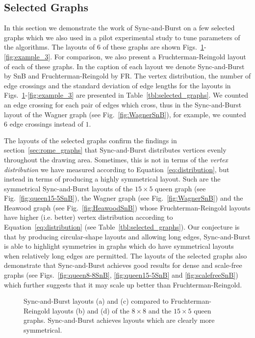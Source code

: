 \documentclass{llncs}
\begin{document}
\subsection{Selected Graphs}\label{sec:selected_graphs}

In this section we demonstrate the work of Sync-and-Burst on a few selected graphs which we also used in a pilot experimental study to tune parameters of the algorithms. The layouts of $6$ of these graphs are shown Figs.~\ref{fig:example_1}-\ref{fig:example_3}. For comparison, we also present a Fruchterman-Reingold layout of each of these graphs. In the caption of each layout we denote Sync-and-Burst by SnB and Fruchterman-Reingold by FR. The vertex distribution, the number of edge crossings and the standard deviation of edge lengths for the layouts in Figs.~\ref{fig:example_1}-\ref{fig:example_3} are presented in Table~\ref{tbl:selected_graphs}. We counted an edge crossing for each pair of edges which cross, thus in the Sync-and-Burst layout of the Wagner graph (see Fig.~\ref{fig:WagnerSnB}), for example, we counted $6$ edge crossings instead of $1$.

The layouts of the selected graphs confirm the findings in section~\ref{sec:rome_graphs} that Sync-and-Burst distributes vertices evenly throughout the drawing area. Sometimes, this is not in terms of the \emph{vertex distribution} we have measured according to Equation~\eqref{eq:distribution}, but instead in terms of producing a highly symmetrical layout. Such are the symmetrical Sync-and-Burst layouts of the $15 \times 5$ queen graph (see Fig.~\ref{fig:queen15-5SnB}), the Wagner graph (see Fig.~\ref{fig:WagnerSnB}) and the Heawood graph (see Fig.~\ref{fig:HeawoodSnB}) whose Fruchterman-Reingold layouts have higher (i.e. better) vertex distribution according to Equation~\eqref{eq:distribution} (see Table~\ref{tbl:selected_graphs}). Our conjecture is that by producing circular-shape layouts and allowing long edges, Sync-and-Burst is able to highlight symmetries in graphs which do have symmetrical layouts when relatively long edges are permitted. The layouts of the selected graphs also demonstrate that Sync-and-Burst achieves good results for dense and scale-free graphs (see Figs.~\ref{fig:queen8-8SnB}, \ref{fig:queen15-5SnB} and \ref{fig:scalefreeSnB}) which further suggests that it may scale up better than Fruchterman-Reingold. 

\begin{figure}
\centering
{}
\caption{Sync-and-Burst layouts (a) and (c) compared to Fruchterman-Reingold layouts (b) and (d) of the $8 \times 8$ and the $15 \times 5$ queen graphs. Sync-and-Burst achieves layouts which are clearly more symmetrical.}
\label{fig:example_1}
\end{figure}
\end{document}
